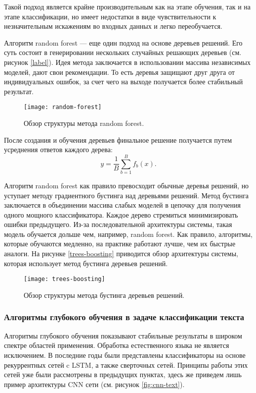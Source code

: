 Такой подход является крайне производительным как на этапе обучения, так и на этапе классификации, но имеет недостатки в виде чувствительности к незначительным искажениям во входных данных и легко переобучается.

Алгоритм random forest\cite{ho1995random} --- еще один подход на основе деревьев решений. Его суть состоит в генерировании нескольких случайных решающих деревьев (см. рисунок \ref{label}). Идея метода заключается в использовании массива независимых моделей, дают свои рекомендации. То есть деревья защищают друг друга от индивидуальных ошибок, за счет чего на выходе получается более стабильный результат.

\begin{figure}[h]
	\centering
	\texttt{[image: random-forest]}
	\caption{Обзор структуры метода random forest.}
	\label{fig:random-forest}
\end{figure}

После создания и обучения деревьев финальное решение получается путем усреднения ответов каждого дерева:
$$y = \frac{1}{B} \sum_{b = 1}^{B} f_b(x).$$

Алгоритм random forest как правило превосходит обычные деревья решений, но уступает методу градиентного бустинга над деревьями решений. Метод бустинга заключается в объединении массива слабых моделей в цепочку для получения одного мощного классификатора. Каждое дерево стремиться минимизировать ошибки предыдущего. Из-за последовательной архитектуры системы, такая модель обучается дольше чем, например, random forest. Как правило, алгоритмы, которые обучаются медленно, на практике работают лучше, чем их быстрые аналоги. На рисунке \ref{trees-boosting} приводится обзор архитектуры системы, которая использует метод бустинга деревьев решений.

\begin{figure}[h]
	\centering
	\texttt{[image: trees-boosting]}
	\caption{Обзор структуры метода бустинга деревьев решений.}
	\label{fig:trees-boosting}
\end{figure}

\subsubsection{Алгоритмы глубокого обучения в задаче классификации текста}
Алгоритмы глубокого обучения показывают стабильные результаты в широком спектре областей применения. Обработка естественного языка не является исключением. В последние годы были представлены классификаторы на основе рекуррентных сетей c LSTM\cite{yogatama2017generative}, а также сверточных сетей\cite{jaderberg2016reading}. Принципы работы этих сетей уже были рассмотрены в предыдущих пунктах, здесь же приведем лишь пример архитектуры CNN сети (см. рисунок \ref{fig:cnn-text}).

